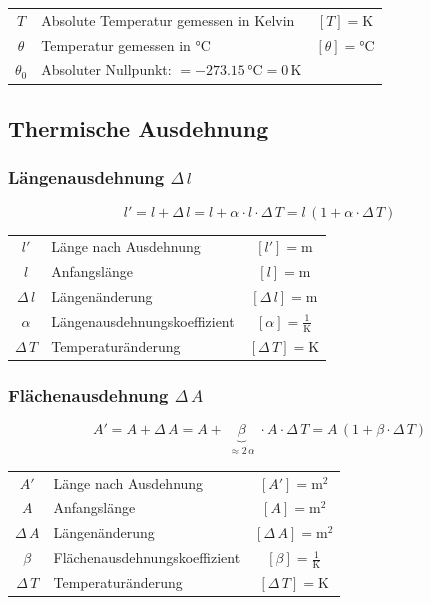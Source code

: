 \begin{tabular}{c l c}
		$T$ & Absolute Temperatur gemessen in Kelvin & $[T] =\mathrm{K}$  \\
		$\theta$ & Temperatur gemessen in °C & $[\theta] = \text{°C}$ \\
		$\theta_0$ & Absoluter Nullpunkt: $= -273.15 \,  \text{°C} = 0 \, \mathrm{K}$  &  \\
\end{tabular}




\subsection{Thermische Ausdehnung}

\subsubsection{Längenausdehnung $\Delta \, l $}

$$ \boxed{  l' = l + \Delta \,  l = l + \alpha \cdot l \cdot \Delta \, T = l\, (1 + \alpha \cdot \Delta \, T ) }$$


\begin{tabular}{c l c}
		$l'$ & Länge nach Ausdehnung & $[l'] = \mathrm{m}$ \\
		$l$ & Anfangslänge & $[l] = \mathrm{m}$ \\
		$\Delta \, l$ & Längenänderung & $[\Delta \, l] = \mathrm{m}$ \\
		\rule{0pt}{8pt}$\alpha$ & Längenausdehnungskoeffizient & $[\alpha] = \mathrm{\frac{1}{K}}$ \\ 
		$\Delta \, T $ & Temperaturänderung & $[\Delta \, T ] = \mathrm{K}$ \\
\end{tabular}


\subsubsection{Flächenausdehnung $\Delta \, A $}

$$ \boxed{ A' = A + \Delta \,  A = A + \underbrace{  \beta }_{\substack{\approx 2 \, \alpha}}  \cdot A \cdot \Delta \, T = A\, (1 + \beta \cdot \Delta \, T ) } $$


\begin{tabular}{c l c}
		$A'$ & Länge nach Ausdehnung & $[A'] = \mathrm{m^2}$ \\
		$A$ & Anfangslänge & $[A] = \mathrm{m^2}$ \\
		$\Delta \, A$ & Längenänderung & $[\Delta \, A] = \mathrm{m^2}$ \\
		\rule{0pt}{8pt}$\beta$ & Flächenausdehnungskoeffizient & $[\beta] = \mathrm{\frac{1}{K}}$ \\ 
		$\Delta \, T $ & Temperaturänderung & $[\Delta \, T ] = \mathrm{K}$ \\
\end{tabular}



